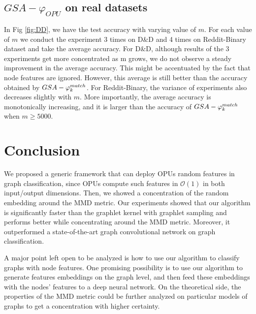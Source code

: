 \documentclass{article}
\begin{document}
\subsection{$GSA-\varphi_{OPU}$  on real datasets}\label{sec:DD_Reddit}
In Fig \ref{fig:DD}, we have the test accuracy with varying value of $m$. For each value of $m$ we conduct the experiment 3 times on D\&D and 4 times on Reddit-Binary dataset and take the average accuracy. For  D\&D, although results of the 3 experiments get more concentrated as m grows, we do not observe a steady improvement in the average accuracy. This  might be accentuated by the fact that node features are ignored. However, this average is still better than the accuracy obtained by $GSA-\varphi^{match}_k$. For Reddit-Binary, the variance of experiments also decreases slightly with $m$. More importantly, the average accuracy is monotonically increasing, and it is larger than the accuracy of  $GSA-\varphi^{match}_k$ when $m\geq5000$. 


\section{Conclusion}
\label{sec:Conclusion}

We proposed a generic framework that can deploy OPUs random features in graph classification, since OPUs compute such features  in  $\mathcal{O}(1)$ in both input/output dimensions. Then, we showed a concentration of the random embedding around the MMD metric. Our experiments showed that our algorithm is significantly faster than the graphlet kernel with graphlet sampling and  performs better while concentrating around the MMD metric. Moreover,  it outperformed a state-of-the-art graph convolutional network on graph classification.

 A major point left open to be analyzed is how to use our algorithm to classify graphs with node features. One promising possibility is to use our algorithm to generate features embeddings on the graph level, and then feed these embeddings with the nodes' features to a deep neural network. On the theoretical side, the properties of the MMD metric could be further analyzed on particular models of graphs to get a concentration with higher certainty. 







\end{document}
